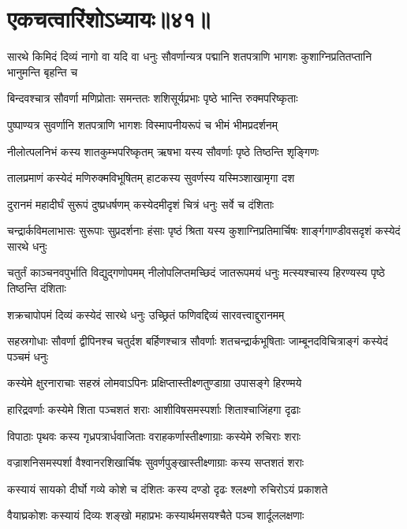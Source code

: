 \chapter{एकचत्वारिंशोऽध्यायः॥४१॥}

\threelineshloka
{सारथे किमिदं दिव्यं नागो वा यदि वा धनुः}
{सौवर्णान्यत्र पद्मानि शतपत्राणि भागशः}
{कुशाग्निप्रतितप्तानि भानुमन्ति बृहन्ति च}


\twolineshloka
{बिन्दवश्चात्र सौवर्णा मणिप्रोताः समन्ततः}
{शशिसूर्यप्रभाः पृष्ठे भान्ति रुक्मपरिष्कृताः}


\twolineshloka
{पुष्पाण्यत्र सुवर्णानि शतपत्राणि भागशः}
{विस्मापनीयरूपं च भीमं भीमप्रदर्शनम्}


\twolineshloka
{नीलोत्पलनिभं कस्य शातकुम्भपरिष्कृतम्}
{ऋषभा यस्य सौवर्णाः पृष्ठे तिष्ठन्ति शृङ्गिणः}


\twolineshloka
{तालप्रमाणं कस्येदं मणिरुक्मविभूषितम्}
{हाटकस्य सुवर्णस्य यस्मिञ्शाखामृगा दश}

\twolineshloka
{दुरानमं महादीर्घं सुरूपं दुष्प्रधर्षणम्}
{कस्येदमीदृशं चित्रं धनुः सर्वे च दंशिताः}


\threelineshloka
{चन्द्रार्कविमलाभासः सुरूपाः सुप्रदर्शनाः}
{हंसाः पृष्ठं श्रिता यस्य कुशाग्निप्रतिमार्चिषः}
{शार्ङ्गगाण्डीवसदृशं कस्येदं सारथे धनुः}


\threelineshloka
{चतुर्तं काञ्चनवपुर्भाति विद्युद्गणोपमम्}
{नीलोपलिप्तमच्छिदं जातरूपमयं धनुः}
{मत्स्यश्चास्य हिरण्यस्य पृष्ठे तिष्ठन्ति दंशिताः}


\twolineshloka
{शक्रचापोपमं दिव्यं कस्येदं सारथे धनुः}
{उच्छ्रितं फणिवद्दिव्यं सारवत्त्वाद्दुरानमम्}


\threelineshloka
{सहस्रगोधाः सौवर्णा द्वीपिनश्च चतुर्दश}
{बर्हिणश्चात्र सौवर्णाः शतचन्द्रार्कभूषिताः}
{जाम्बूनदविचित्राङ्गं कस्येदं पञ्चमं धनुः}


\twolineshloka
{कस्येमे क्षुरनाराचाः सहस्रं लोमवाऽपिनः}
{प्रक्षिप्तास्तीक्ष्णतुण्डाग्रा उपासङ्गे हिरण्मये}


\twolineshloka
{हारिद्रवर्णाः कस्येमे शिता पञ्चशतं शराः}
{आशीविषसमस्पर्शाः शिताश्चाजिंहगा दृढाः}


\twolineshloka
{विपाठाः पृथवः कस्य गृध्रपत्रार्धवाजिताः}
{वराहकर्णास्तीक्ष्णाग्राः कस्येमे रुचिराः शराः}


\twolineshloka
{वज्राशनिसमस्पर्शा वैश्वानरशिखार्चिषः}
{सुवर्णपुङ्खास्तीक्ष्णाग्राः कस्य सप्तशतं शराः}


\twolineshloka
{कस्यायं सायको दीर्घो गव्ये कोशे च दंशितः}
{कस्य दण्डो दृढः श्लक्ष्णो रुचिरोऽयं प्रकाशते}


\twolineshloka
{वैयाघ्रकोशः कस्यायं दिव्यः शङ्खो महाप्रभः}
{कस्यार्थमसयश्चैते पञ्च शार्दूललक्षणाः}


